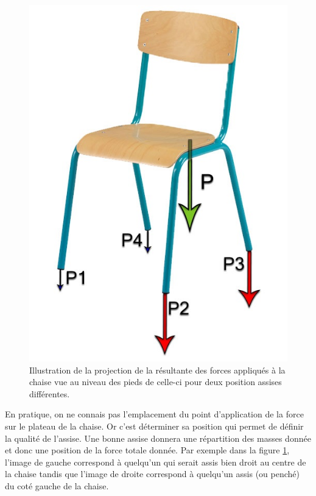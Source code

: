 \documentclass{polytech/polytech}
\begin{document}
\begin{figure}[htbp]
\begin{center}
\includegraphics[scale=1]{image/Chaise_forces_hetero.jpg}
\end{center}
\caption{Illustration de la projection de la résultante des forces appliqués à la chaise vue au niveau des pieds de celle-ci pour deux position assises différentes.}
\label{fig:illustr_chaise_forces}
\end{figure}

En pratique, on ne connais pas l'emplacement du point d'application de la force sur le plateau de la chaise. 
Or c'est déterminer sa position qui permet de définir la qualité de l'assise. 
Une bonne assise donnera une répartition des masses donnée et donc une position de la force totale donnée.
 Par exemple dans la figure \ref{fig:illustr_chaise_forces}, l'image de gauche correspond à quelqu'un qui serait assis bien droit au centre de la chaise tandis que l'image de droite correspond à quelqu'un assis (ou penché) du coté gauche de la chaise.
\end{document}
